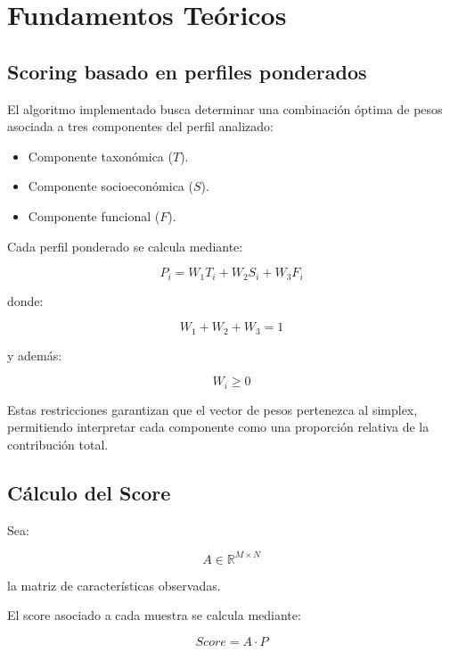 \chapter{Fundamentos Teóricos}

\section{Scoring basado en perfiles ponderados}

El algoritmo implementado busca determinar una combinación óptima de pesos asociada a tres componentes del perfil analizado:

\begin{itemize}
    \item Componente taxonómica ($T$).
    \item Componente socioeconómica ($S$).
    \item Componente funcional ($F$).
\end{itemize}

Cada perfil ponderado se calcula mediante:

\begin{equation}
P_i = W_1T_i + W_2S_i + W_3F_i
\end{equation}

donde:

\begin{equation}
W_1 + W_2 + W_3 = 1
\end{equation}

y además:

\begin{equation}
W_i \ge 0
\end{equation}

Estas restricciones garantizan que el vector de pesos pertenezca al simplex, permitiendo interpretar cada componente como una proporción relativa de la contribución total.

\section{Cálculo del Score}

Sea:

\[
A \in \mathbb{R}^{M\times N}
\]

la matriz de características observadas.

El score asociado a cada muestra se calcula mediante:

\begin{equation}
Score = A \cdot P
\end{equation}

